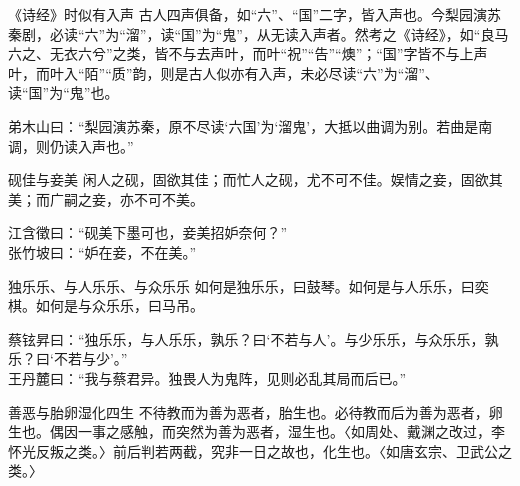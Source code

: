 \begin{yulu}{《诗经》时似有入声}
古人四声俱备，如“六”、“国”二字，皆入声也。今梨园演苏秦剧，必读“六”为“溜”，读“国”为“鬼”，从无读入声者。然考之《诗经》，如“良马六之、无衣六兮”之类，皆不与去声叶，而叶“祝”“告”“燠”；“国”字皆不与上声叶，而叶入“陌”“质”韵，则是古人似亦有入声，未必尽读“六”为“溜”、读“国”为“鬼”也。
\begin{comments}
弟木山曰：“梨园演苏秦，原不尽读‘六国’为‘溜鬼’，大抵以曲调为别。若曲是南调，则仍读入声也。”
\end{comments}
\end{yulu}

\begin{yulu}{砚佳与妾美}
闲人之砚，固欲其佳；而忙人之砚，尤不可不佳。娱情之妾，固欲其美；而广嗣之妾，亦不可不美。
\begin{comments}
江含徵曰：“砚美下墨可也，妾美招妒奈何？” \\
张竹坡曰：“妒在妾，不在美。”
\end{comments}
\end{yulu}

\begin{yulu}{独乐乐、与人乐乐、与众乐乐}
如何是独乐乐，曰鼓琴。如何是与人乐乐，曰奕棋。如何是与众乐乐，曰马吊。
\begin{comments}
蔡铉昇曰：“独乐乐，与人乐乐，孰乐？曰‘不若与人’。与少乐乐，与众乐乐，孰乐？曰‘不若与少’。” \\
王丹麓曰：“我与蔡君异。独畏人为鬼阵，见则必乱其局而后已。”
\end{comments}
\end{yulu}

\begin{yulu}{善恶与胎卵湿化四生}
不待教而为善为恶者，胎生也。必待教而后为善为恶者，卵生也。偶因一事之感触，而突然为善为恶者，湿生也。〈如周处、戴渊之改过，李怀光反叛之类。〉前后判若两截，究非一日之故也，化生也。〈如唐玄宗、卫武公之类。〉
\begin{comments}

\end{comments}
\end{yulu}

\begin{yulu}{}

\begin{comments}

\end{comments}
\end{yulu}

\begin{yulu}{}

\begin{comments}

\end{comments}
\end{yulu}

